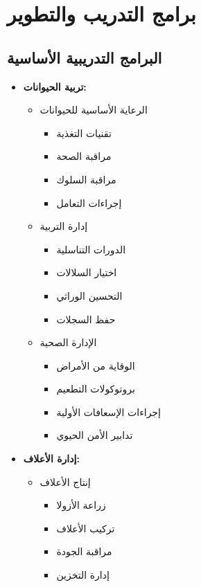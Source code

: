 \section{برامج التدريب والتطوير}

\subsection{البرامج التدريبية الأساسية}
\begin{itemize}
    \item \textbf{تربية الحيوانات:}
    \begin{itemize}
        \item الرعاية الأساسية للحيوانات
        \begin{itemize}
            \item تقنيات التغذية
            \item مراقبة الصحة
            \item مراقبة السلوك
            \item إجراءات التعامل
        \end{itemize}
        
        \item إدارة التربية
        \begin{itemize}
            \item الدورات التناسلية
            \item اختيار السلالات
            \item التحسين الوراثي
            \item حفظ السجلات
        \end{itemize}
        
        \item الإدارة الصحية
        \begin{itemize}
            \item الوقاية من الأمراض
            \item بروتوكولات التطعيم
            \item إجراءات الإسعافات الأولية
            \item تدابير الأمن الحيوي
        \end{itemize}
    \end{itemize}
    
    \item \textbf{إدارة الأعلاف:}
    \begin{itemize}
        \item إنتاج الأعلاف
        \begin{itemize}
            \item زراعة الأزولا
            \item تركيب الأعلاف
            \item مراقبة الجودة
            \item إدارة التخزين
        \end{itemize}
        

\end{itemize}
\end{itemize}
